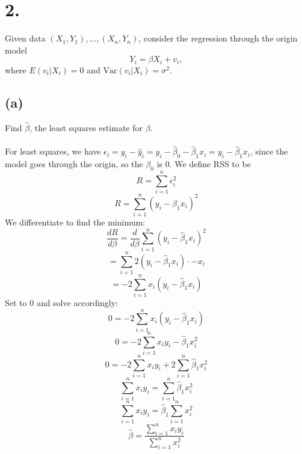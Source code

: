 \documentclass{article}
\begin{document}
{\Large 

\section*{2.}
Given data \((X_1, Y_1), \dots, (X_n, Y_n)\), consider the regression through the origin model
\[
  Y_i = \beta X_i + v_i, 
\]
where \(E(v_i | X_i) = 0\) and \(\text{Var}(v_i | X_i) = \sigma^2\).

\subsection*{(a)} 
Find \(\hat{\beta}\), the least squares estimate for \(\beta\). \\ \\
For least squares, we have \(\epsilon_i = y_i - \hat{y}_i = y_i - \hat{\beta}_0 - \hat{\beta}_1 x_i = y_i - \hat{\beta}_1 x_i\), since the model goes through the origin, so the \(\beta_0\) is 0. We define RSS to be 
\[
  R = \sum_{i=1}^{n} \epsilon_i^2
\]
\[
  R = \sum_{i=1}^{n} (y_i - \hat{\beta}_1 x_i)^2
\]
We differentiate to find the minimum:
\[
  \frac{dR}{d\beta} = \frac{d}{d\beta} \sum_{i=1}^{n} (y_i - \hat{\beta}_1 x_i)^2
\]
\[
  = \sum_{i=1}^{n} 2 (y_i - \hat{\beta}_1 x_i) \cdot -x_i
\]
\[
  = -2 \sum_{i=1}^{n} x_i (y_i - \hat{\beta}_1 x_i)
\]
Set to 0 and solve accordingly:
\[
  0 = -2 \sum_{i=1}^{n} x_i (y_i - \hat{\beta}_1 x_i)
\]
\[
  0 = -2 \sum_{i=1}^{n} x_i y_i - \hat{\beta}_1 x_i^2
\]
\[
  0 = -2 \sum_{i=1}^{n} x_i y_i + 2 \sum_{i=1}^{n} \hat{\beta}_1 x_i^2
\]
\[
  \sum_{i=1}^{n} x_i y_i = \sum_{i=1}^{n} \hat{\beta}_1 x_i^2
\]
\[
  \sum_{i=1}^{n} x_i y_i = \hat{\beta}_1 \sum_{i=1}^{n} x_i^2
\]
\[
  \boxed{\hat{\beta} = \frac{\sum_{i=1}^{n} x_i y_i}{\sum_{i=1}^{n} x_i^2}}
\]

}
\end{document}

